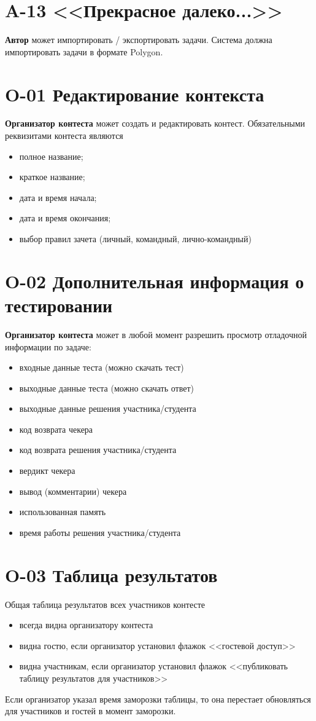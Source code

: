 \documentclass{book}
\newcommand{\newcard}[1]{\newpage \section*{#1}}
\begin{document}
\newcard{A-13 <<Прекрасное далеко...>>}
\textbf{Автор} может импортировать / экспортировать задачи. Система должна импортировать задачи в формате Polygon.



\newcard{O-01 Редактирование контекста}
\textbf{Организатор контеста} может создать и редактировать контест.
Обязательными реквизитами контеста являются
\begin{itemize}\setlength{\itemsep}{0pt}
	\item полное название;
	\item краткое название;
	\item дата и время начала;
	\item дата и время окончания;
	\item выбор правил зачета (личный, командный, лично-командный)
\end{itemize}


\newcard{O-02 Дополнительная информация о тестировании}
\textbf{Организатор контеста} может в любой момент разрешить просмотр отладочной информации по задаче:
\begin{itemize}\setlength{\itemsep}{0pt}
	\item входные данные теста (можно скачать тест)
	\item выходные данные теста (можно скачать ответ)
	\item выходные данные решения участника/студента
	\item код возврата чекера
	\item код возврата решения участника/студента
	\item вердикт чекера
	\item вывод (комментарии) чекера
	\item использованная память
	\item время работы решения участника/студента
\end{itemize}


\newcard{O-03 Таблица результатов}
	Общая таблица результатов всех участников контесте 
\begin{itemize}\setlength{\itemsep}{0pt}
	\item всегда видна организатору контеста
	\item видна гостю, если организатор установил флажок <<гостевой доступ>>
	\item видна участникам, если организатор установил флажок <<публиковать таблицу результатов для участников>>
\end{itemize}
	Если организатор указал время заморозки таблицы, то она перестает обновляться для участников и гостей в момент заморозки.
\end{document}
